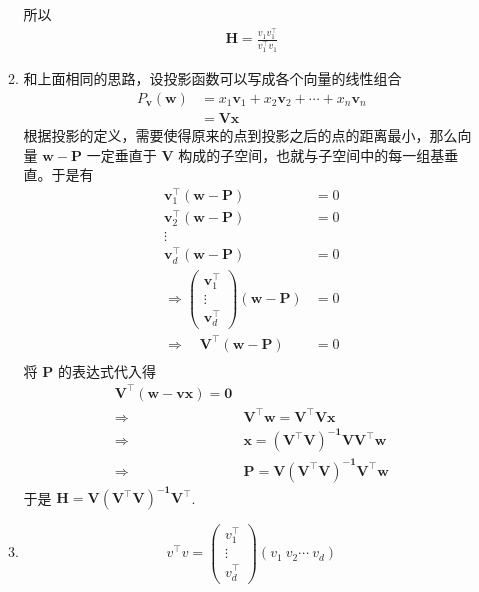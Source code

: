 \documentclass[11pt,letter,notitlepage]{article}
\begin{document}
\begin{solution}
\begin{enumerate}
\begin{enumerate}
				所以\\ 
				\begin{align*}
					\mathbf{H} = \frac{v_{1} v_{1}^{\top}}{v_{1}^{\top} v_{1}}
				\end{align*}
			\item 和上面相同的思路，设投影函数可以写成各个向量的线性组合
				\begin{align*}
				P_{\mathbf{v}}(\mathbf{w}) &=x_{1} \mathbf{v}_{1}+x_{2} \mathbf{v}_{2}+\cdots+x_{n} \mathbf{v}_{n} \\ &=\mathbf{V} \mathbf{x} 
				\end{align*}
				根据投影的定义，需要使得原来的点到投影之后的点的距离最小，那么向量 $\mathbf{w} - \mathbf{P}$ 一定垂直于 $\mathbf{V}$ 构成的子空间，也就与子空间中的每一组基垂直。于是有\\
				\begin{align*} 
				\mathbf{v}_{1}^{\top}(\mathbf{w}-\mathbf{P}) &=0 \\ \mathbf{v}_{2}^{\top}(\mathbf{w}-\mathbf{P}) &=0 \\ \vdots \\ \mathbf{v}_{d}^{\top}(\mathbf{w}-\mathbf{P}) &=0 \\ \Rightarrow\left(\begin{array}{c}{\mathbf{v}_{1}^{\top}}\\ \vdots \\ {\mathbf{v}_{d}^{\top}}\end{array}\right)(\mathbf{w}-\mathbf{P}) &=0 \\ \Rightarrow \quad \mathbf{V}^{\top}(\mathbf{w}-\mathbf{P})&=0 \\ 
				\end{align*}
				将 $\mathbf{P}$ 的表达式代入得\\
				\begin{align*} 
					\mathbf{V^{\top}(w-v x)=0} \\ \Rightarrow & \mathbf{V^{\top} w =V^{\top} V x} \\ \Rightarrow & \mathbf{x=\left(V^{\top} V\right)^{-1}VV^{\top} w}  \\ \Rightarrow & \mathbf{P=V\left(V^{\top} V\right)^{-1} V^{\top} w}  
				\end{align*}
				于是 $\mathbf{H} = \mathbf{V\left(V^{\top} V\right)^{-1} V^{\top}}$.
				\item $$
			v^{\top} v=\left(\begin{array}{c}{v_{1}^{\top}} \\ \vdots \\ {v_{d}^{\top}}\end{array}\right)\left(v_{1} \  v_{2} \cdots \  v_{d}\right)
$$
\end{enumerate}
\end{enumerate}
\end{solution}
\end{document}
